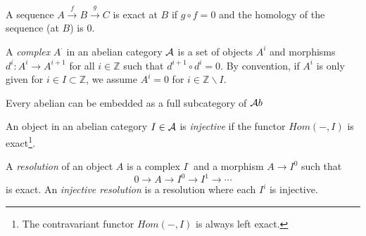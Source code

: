 \begin{definition}
A sequence $A\xrightarrow{f}B\xrightarrow{g} C$ is exact at $B$ if
$g\circ f=0$ and the homology of the sequence (at $B$) is 0.
\end{definition}

\begin{definition}
A \emph{complex} $A^{\cdot}$ in an abelian category $\mathcal{A}$ is a set
of objects $A^i$ and morphisms $d^i:A^i\to A^{i+1}$  for all $i\in
\mathbb{Z}$ such that $d^{i+1}\circ d^i = 0$.  By convention, if
$A^i$ is only given for $i\in I\subset \mathbb{Z}$, we assume
$A^i=0$ for $i\in \mathbb{Z}\smallsetminus I$.
\end{definition}

\begin{theorem}
Every abelian can be embedded as a full subcategory of $\mathcal{A}b$
\end{theorem}

\begin{definition}
An object in an abelian category $I\in \mathcal{A}$ is \emph{injective} if
the functor $Hom(-,I)$ is exact\footnote{The contravariant functor
$Hom(-,I)$ is always left exact.}.
\end{definition}

\begin{definition}
A \emph{resolution} of an object $A$ is a complex $I^{\cdot}$ and
a morphism $A\to I^0$ such that
\[
    0\to A\to I^0\to I^1\to \cdots
\]
is exact.  An \emph{injective resolution} is a resolution where
each $I^i$ is injective.
\end{definition}
